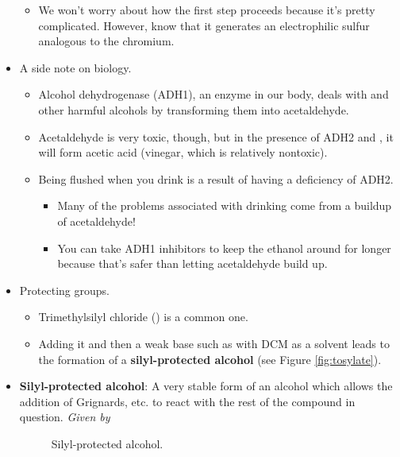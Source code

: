 \documentclass[../notes.tex]{subfiles}
\begin{document}
\begin{itemize}
\begin{figure}[h!]
        \label{fig:swernOxidation}
    \end{figure}
    \begin{itemize}
        \item We won't worry about how the first step proceeds because it's pretty complicated. However, know that it generates an electrophilic sulfur analogous to the chromium.
    \end{itemize}
    \item A side note on biology.
    \begin{itemize}
        \item Alcohol dehydrogenase (ADH1), an enzyme in our body, deals with  and other harmful alcohols by transforming them into acetaldehyde.
        \item Acetaldehyde is very toxic, though, but in the presence of ADH2 and , it will form acetic acid (vinegar, which is relatively nontoxic).
        \item Being flushed when you drink is a result of having a deficiency of ADH2.
        \begin{itemize}
            \item Many of the problems associated with drinking come from a buildup of acetaldehyde!
            \item You can take ADH1 inhibitors to keep the ethanol around for longer because that's safer than letting acetaldehyde build up.
        \end{itemize}
    \end{itemize}
    \item Protecting groups.
    \begin{itemize}
        \item Trimethylsilyl chloride () is a common one.
        \item Adding it and then a weak base such as  with DCM as a solvent leads to the formation of a \textbf{silyl-protected alcohol} (see Figure \ref{fig:tosylate}).
    \end{itemize}
    \item \textbf{Silyl-protected alcohol}: A very stable form of an alcohol which allows the addition of Grignards, etc. to react with the rest of the compound in question. \emph{Given by}
    \begin{figure}[h!]
        \centering
        \footnotesize
        \caption{Silyl-protected alcohol.}
        \label{fig:silylProtectedAlcohol}
    \end{figure}

\end{itemize}
\end{document}
